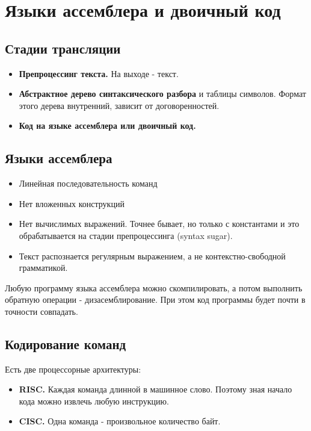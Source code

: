 \section{Языки ассемблера и двоичный код}

\subsection{Стадии трансляции}

\begin{itemize}
	\item \textbf{Препроцессинг текста.} На выходе - текст.
	\item \textbf{Абстрактное дерево синтаксического разбора} и таблицы символов. Формат этого дерева внутренний, зависит от договоренностей.
	\item \textbf{Код на языке ассемблера или двоичный код.}
\end{itemize}

\subsection{Языки ассемблера}

\begin{itemize}
	\item Линейная последовательность команд
	\item Нет вложенных конструкций
	\item Нет вычислимых выражений. Точнее бывает, но только с константами и
	это обрабатывается на стадии препроцессинга (syntax sugar).
	\item Текст распознается регулярным выражением, а не контекстно-свободной грамматикой.
\end{itemize}

Любую программу языка ассемблера можно скомпилировать, а потом выполнить обратную 
операции - дизасемблирование. При этом код программы будет почти в точности совпадать. 

\subsection{Кодирование команд}

Есть две процессорные архитектуры:
\begin{itemize}
	\item \textbf{RISC.} Каждая команда длинной в машинное слово. Поэтому зная 
	начало кода можно извлечь любую инструкцию.
	\item \textbf{CISC.} Одна команда - произвольное количество байт.
\end{itemize}


